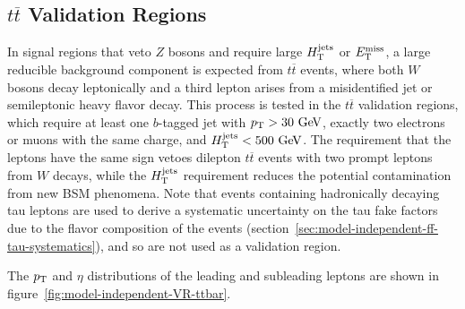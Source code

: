 \subsection{$t\overline{t}$ Validation Regions}\label{sec:model-independent-validation-regions-ttbar}
In signal regions that veto $Z$ bosons and require large $H_{\mathrm{T}}^{\mathrm{jets}}$ or $E_{\text{T}}^{\text{miss}}$, a large reducible background component is expected from $t\overline{t}$ events, where both $W$ bosons decay leptonically and a third lepton arises from a misidentified jet or semileptonic heavy flavor decay. This process is tested in the $t\overline{t}$ validation regions, which require at least one $b$-tagged jet with $\pt>30 \GeV$, exactly two electrons or muons with the same charge, and $\Ht<500 \GeV$. The requirement that the leptons have the same sign vetoes dilepton $t\overline{t}$ events with two prompt leptons from $W$ decays, while the $H_{\mathrm{T}}^{\mathrm{jets}}$ requirement reduces the potential contamination from new BSM phenomena. Note that events containing hadronically decaying tau leptons are used to derive a systematic uncertainty on the tau fake factors due to the flavor composition of the events (section~\ref{sec:model-independent-ff-tau-systematics}), and so are not used as a validation region. 

The $p_{\text{T}}$ and $\eta$ distributions of the leading and subleading leptons are shown in figure~\ref{fig:model-independent-VR-ttbar}.

